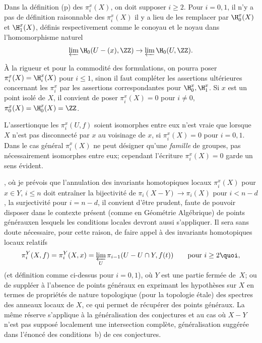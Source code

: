 \label{p25y}%
Dans la d\'efinition (p\ptbl{}) des $\pi_i^x(X)$, on doit supposer $i\geq 2$. Pour $i=0, 1$, il n'y a pas de d\'efinition raisonnable des $\pi_i^x(X)$\sisi{,}{;} il y a lieu de les remplacer par $\H_0^x(X)$ et $\H_1^x(X)$, d\'efinis respectivement comme le co\sisi{-}{}noyau et le noyau dans l'homomorphisme naturel
$$
\varprojlim \H_0(U-(x), \ZZ)\to\varprojlim\H_0(U, \ZZ).
$$

À la rigueur et pour la commodit\'e des formulations, on pourra poser $\pi_i^x(X)=\H_i^x(X)$ pour $i\leq 1$, sinon il faut compl\'eter les assertions ult\'erieures concernant les $\pi_i^x$ par les assertions correspondantes pour $\H_0^x, \H_1^x$. Si $x$ est un point isol\'e de $X$, il convient de poser $\pi_i^x(X)=0$ pour $i\neq 0$, $\pi_0^x(X)=\H_0^x(X)=\ZZ$.

L'assertion\pageoriginale que les $\pi_i^x(U, f)$ soient isomorphes entre eux n'est vraie que lorsque $X$ n'est pas disconnect\'e par $x$ au voisinage de $x$, \ie si $\pi_i^x(X)=0$ pour $i=0, 1$. Dans le cas g\'en\'eral $\pi_i^x(X)$ ne peut d\'esigner qu'une \emph{famille} de groupes, pas n\'ecessairement isomorphes entre eux; cependant l'\'ecriture $\pi_i^x(X)=0$ garde un sens \'evident.

\label{p26y}, o\`u je pr\'evois que l'annulation des invariants homotopiques locaux $\pi_i^x(X)$ pour $x\in Y$, $i\leq n$ doit entra\^iner la bijectivit\'e de $\pi_i(X-Y)\to\pi_i(X)$ pour $i<n-d$, la surjectivit\'e pour $i=n-d$, il convient d'\^etre prudent, faute de pouvoir disposer dans le contexte pr\'esent (comme en G\'eom\'etrie Alg\'ebrique) de points \og g\'en\'eraux\fg en lesquels les conditions locales devront aussi s'appliquer. Il sera sans doute n\'ecessaire, pour cette raison, de faire appel \`a des invariants homotopiques locaux relatifs
$$
\pi_i^Y(X, f)=\pi_i^Y(X, x)=\varprojlim_U \pi_{i-1}(U-U\cap Y, f(t))\qquad\text{pour }i\geq 2\quoi,
$$
(et d\'efinition {} comme ci-dessus pour $i=0, 1$), o\`u $Y$ est une partie ferm\'ee de~$X$; ou de suppl\'eer \`a l'absence de points g\'en\'eraux en exprimant les hypoth\`eses sur $X$ en termes de propri\'et\'es de nature topologique (pour la topologie \'etale) des spectres des anneaux locaux de $X$, ce qui permet de r\'ecup\'erer des points g\'en\'eraux. La m\^eme r\'eserve s'applique \`a la g\'en\'eralisation des conjectures  et  au cas o\`u $X-Y$ n'est pas suppos\'e localement une intersection compl\`ete, g\'en\'eralisation sugg\'er\'ee dans l'\'enonc\'e des conditions~b) de ces conjectures.

